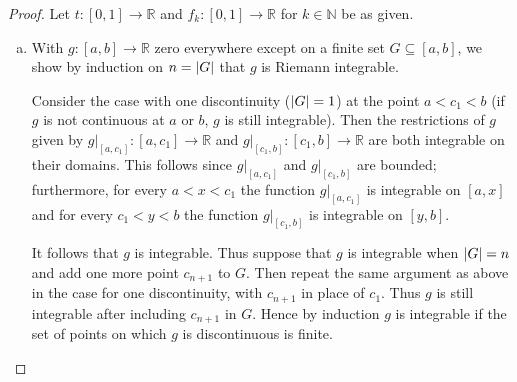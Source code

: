 \documentclass[12pt]{amsart}
\begin{document}
\begin{proof} Let $t\colon [0,1]\to \mathbb{R}$ and $f_k\colon [0,1]\to\mathbb{R}$ for $k\in \mathbb{N}$ be as given.

\begin{enumerate}[(a)]
    \item With $g\colon[a,b]\to \mathbb{R}$ zero everywhere except on a finite set $G\subseteq [a,b]$, we show by induction on $n = \abs{G}$ that $g$ is Riemann integrable.
    
    Consider the case with one discontinuity ($\abs{G} = 1$) at the point $a < c_1 < b$ (if $g$ is not continuous at $a$ or $b$, $g$ is still integrable). Then the restrictions of $g$ given by $g|_{[a,c_1]}\colon [a,c_1]\to \mathbb{R}$ and $g|_{[c_1, b]}\colon [c_1,b]\to \mathbb{R}$ are both integrable on their domains. This follows since $g|_{[a,c_1]}$ and $g|_{[c_1, b]}$ are bounded; furthermore, for every $a< x< c_1$ the function $g|_{[a,c_1]}$ is integrable on $[a,x]$ and for every $c_1< y < b$ the function $g|_{[c_1, b]}$ is integrable on $[y,b]$. 

    It follows that $g$ is integrable. Thus suppose that $g$ is integrable when $\abs{G} = n$ and add one more point $c_{n+1}$ to $G$. Then repeat the same argument as above in the case for one discontinuity, with $c_{n+1}$ in place of $c_1$. Thus $g$ is still integrable after including $c_{n+1}$ in $G$. Hence by induction $g$ is integrable if the set of points on which $g$ is discontinuous is finite.


\end{enumerate}
\end{proof}
\end{document}
